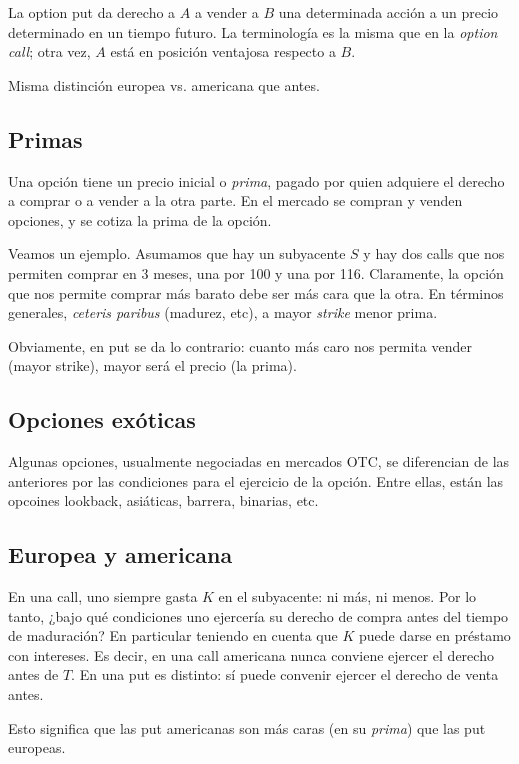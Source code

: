 \documentclass[a4paper, 12pt]{article}
\theoremstyle{definition}
\begin{document}
La option put da derecho a $A$ a vender a $B$ una determinada acción a un precio
determinado en un tiempo futuro. La terminología es la misma que en la
\textit{option call}; otra vez, $A$ está en posición ventajosa respecto a $B$.

Misma distinción europea vs. americana que antes.


\subsection{Primas}

Una opción tiene un precio inicial o \textit{prima}, pagado por quien adquiere
el derecho a comprar o a vender a la otra parte. En el mercado se compran y
venden opciones, y se cotiza la prima de la opción.

Veamos un ejemplo. Asumamos que hay un subyacente $S$ y hay dos calls que nos
permiten comprar en 3 meses, una por 100 y una por 116. Claramente, la opción
que nos permite comprar más barato debe ser más cara que la otra. En términos
generales, \textit{ceteris paribus} (madurez, etc), a mayor \textit{strike}
menor prima.

Obviamente, en put se da lo contrario: cuanto más caro nos permita vender (mayor
strike), mayor será el precio (la prima).

\subsection{Opciones exóticas}

Algunas opciones, usualmente negociadas en mercados OTC, se diferencian de las
anteriores por las condiciones para el ejercicio de la opción. Entre ellas,
están las opcoines lookback, asiáticas, barrera, binarias, etc.

\subsection{Europea y americana}

En una call, uno siempre gasta $K$ en el subyacente: ni más, ni menos. Por lo
tanto, ¿bajo qué condiciones uno ejercería su derecho de compra antes del tiempo
de maduración? En particular teniendo en cuenta que $K$ puede darse en préstamo
con intereses. Es decir, en una call americana nunca conviene ejercer el derecho
antes de $T$. En una put es distinto: sí puede convenir ejercer el derecho de
venta antes.

Esto significa que las put americanas son más caras (en su \textit{prima}) que
las put europeas.
\end{document}
